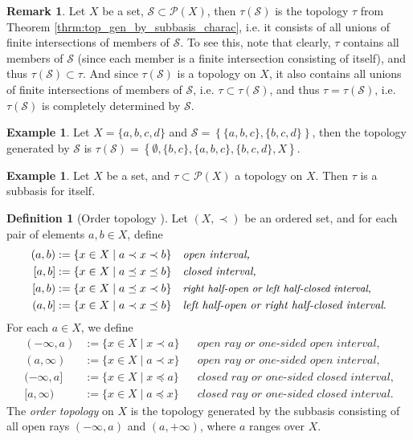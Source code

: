 \documentclass[12pt, a4paper]{article}
\numberwithin{equation}{section}
\theoremstyle{definition}
\theoremstyle{definition}
\newtheorem{defn}[thm]{Definition} %
\newtheorem{exmp}[thm]{Example} %
\newtheorem{remark}[thm]{Remark} %
\begin{document}
		\begin{remark}
			Let $X$ be a set, $\mathscr S\subset \mathscr P(X)$, then $\tau(\mathscr S)$ is the topology $\tau$ from Theorem \ref{thrm:top_gen_by_subbasis_charac}, i.e. it consists of all unions of finite intersections of members of $\mathscr S$. To see this, note that clearly, $\tau$ contains all members of $\mathscr S$ (since each member is a finite intersection consisting of itself), and thus $\tau(\mathscr S)\subset \tau$. And since $\tau(\mathscr S)$ is a topology on $X$, it also contains all unions of finite intersections of members of $\mathscr S$, i.e. $\tau\subset \tau(\mathscr S)$, and thus $\tau = \tau(\mathscr S)$, i.e. $\tau(\mathscr S)$ is completely determined by $\mathscr S$.
		\end{remark}
	
		\begin{exmp}\label{exmp:subbasis}
			Let $X = \{a, b, c, d\}$ and $\mathscr S = \left\{ \{a, b, c\}, \{b, c, d\} \right\}$, then the topology generated by $\mathscr S$ is $\tau(\mathscr S) = \left\{ \emptyset, \{b, c\}, \{a, b, c\}, \{b, c, d\}, X \right\}$.
		\end{exmp}
	
		\begin{exmp}
			Let $X$ be a set, and $\tau\subset \mathscr P(X)$ a topology on $X$. Then $\tau$ is a subbasis for itself.
		\end{exmp}
	
		\begin{defn}[Order topology \cite{topology-singh}]\label{defn:order_topology}
			Let $(X, \prec)$ be an ordered set, and for each pair of elements $a, b\in X$, define
			\begin{align*}
				(a, b) &:= \{x\in X\mid a \prec x \prec b\} &&\textit{open interval,}
				\\ [a, b] &:= \{x\in X \mid a \preceq x \preceq b \} && \textit{closed interval,}
				\\ [a, b) &:= \{x\in X\mid a \preceq x\prec b \} && \small\textit{right half-open or left half-closed interval}\normalsize,
				\\ (a, b] &:= \{x\in X\mid a \prec x\preceq b \} && \textit{left half-open or right half-closed interval}.
			\end{align*}
			For each $a\in X$, we define
			\begin{align*}
				(-\infty, a) &:= \{x\in X \mid x \prec a\} && \textit{open ray or one-sided open interval,}
				\\ (a, \infty) &:= \{x\in X \mid a \prec x\} && \textit{open ray or one-sided open interval,}
				\\ (-\infty, a] &:= \{x\in X \mid x \preceq a\} && \textit{closed ray or one-sided closed interval,}
				\\ [a, \infty) &:= \{x\in X\mid a \preceq x \} && \textit{closed ray or one-sided closed interval.}
			\end{align*}
			The \textit{order topology} on $X$ is the topology generated by the subbasis consisting of all open rays $(-\infty, a)$ and $(a, +\infty)$, where $a$ ranges over $X$.
		\end{defn}
	
\end{document}

